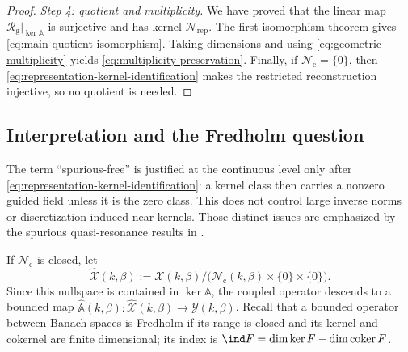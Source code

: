 \begin{proof}
\emph{Step 4: quotient and multiplicity.}
We have proved that the linear map
$\mathcal R_{\mathrm g}|_{\ker\mathbb A}$ is surjective and has kernel
$\mathcal N_{\mathrm{rep}}$.  The first isomorphism theorem gives
\eqref{eq:main-quotient-isomorphism}.  Taking dimensions and using
\eqref{eq:geometric-multiplicity} yields
\eqref{eq:multiplicity-preservation}.  Finally, if
$\mathcal N_{\mathrm c}=\{0\}$, then
\eqref{eq:representation-kernel-identification} makes the restricted
reconstruction injective, so no quotient is needed.
\end{proof}

\subsection{Interpretation and the Fredholm question}

The term ``spurious-free'' is justified at the continuous level only after
\eqref{eq:representation-kernel-identification}: a kernel class then carries a
nonzero guided field unless it is the zero class.  This does not control large
inverse norms or discretization-induced near-kernels.  Those distinct issues
are emphasized by the spurious quasi-resonance results in
\cite[Theorems~1.10--1.12]{HiptmairMoiolaSpence2022}.

If $\mathcal N_{\mathrm c}$ is closed, let
\[
  \widehat{\mathcal X}(k,\beta):=
  \mathcal X(k,\beta)/
  \bigl(\mathcal N_{\mathrm c}(k,\beta)\times\{0\}\times\{0\}\bigr).
\]
Since this nullspace is contained in $\ker\mathbb A$, the coupled operator
descends to a bounded map
$\widehat{\mathbb A}(k,\beta):\widehat{\mathcal X}(k,\beta)
\to\mathcal Y(k,\beta)$.  Recall that a bounded operator between Banach spaces
is Fredholm if its range is closed and its kernel and cokernel are finite
dimensional; its index is $\ind F=\dim\ker F-\dim\operatorname{coker}F$.

